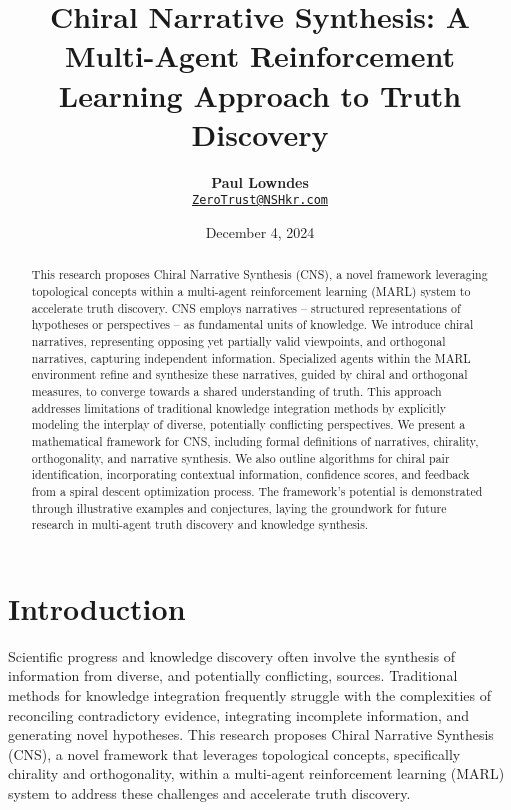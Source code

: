 \documentclass[12pt, a4paper]{article}
\title{\vspace{-2cm}\textbf{Chiral Narrative Synthesis:  A Multi-Agent Reinforcement Learning Approach to Truth Discovery}}
\author{\textbf{Paul Lowndes} \\ \href{mailto:ZeroTrust@NSHkr.com}{\texttt{ZeroTrust@NSHkr.com}}}
\date{\small December 4, 2024}
\begin{document}
\maketitle
\vspace{-1.5em} 


\begin{abstract}
This research proposes Chiral Narrative Synthesis (CNS), a novel framework leveraging topological concepts within a multi-agent reinforcement learning (MARL) system to accelerate truth discovery. CNS employs narratives – structured representations of hypotheses or perspectives – as fundamental units of knowledge. We introduce chiral narratives, representing opposing yet partially valid viewpoints, and orthogonal narratives, capturing independent information. Specialized agents within the MARL environment refine and synthesize these narratives, guided by chiral and orthogonal measures, to converge towards a shared understanding of truth. This approach addresses limitations of traditional knowledge integration methods by explicitly modeling the interplay of diverse, potentially conflicting perspectives. We present a mathematical framework for CNS, including formal definitions of narratives, chirality, orthogonality, and narrative synthesis. We also outline algorithms for chiral pair identification, incorporating contextual information, confidence scores, and feedback from a spiral descent optimization process.  The framework's potential is demonstrated through illustrative examples and conjectures, laying the groundwork for future research in multi-agent truth discovery and knowledge synthesis.
\end{abstract}

\section{Introduction}

Scientific progress and knowledge discovery often involve the synthesis of information from diverse, and potentially conflicting, sources.  Traditional methods for knowledge integration frequently struggle with the complexities of reconciling contradictory evidence, integrating incomplete information, and generating novel hypotheses. This research proposes Chiral Narrative Synthesis (CNS), a novel framework that leverages topological concepts, specifically chirality and orthogonality, within a multi-agent reinforcement learning (MARL) system to address these challenges and accelerate truth discovery.
\end{document}
